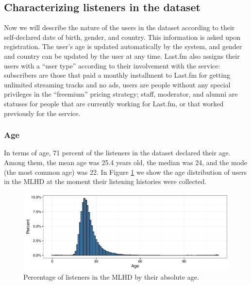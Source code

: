 \subsection{Characterizing listeners in the dataset }\label{subsec:dataset-listeners}
Now we will describe the nature of the users in the dataset according to their self-declared date of birth, gender, and country. This information is asked upon registration. The user's age is updated automatically by the system, and gender and country can be updated by the user at any time. 
Last.fm also assigns their users with a ``user type'' according to their involvement with the service: subscribers are those that paid a monthly installment to Last.fm for getting unlimited streaming tracks and no ads, users are people without any special privileges in the ``freemium'' pricing strategy; staff, moderator, and alumni are statuses for people that are currently working for Last.fm, or that worked previously for the service.

\subsubsection{Age}
In terms of age, 71 percent of the listeners in the dataset declared their age. Among them, the mean age was 25.4 years old, the median was 24, and the mode (the most common age) was 22. In Figure \ref{fig:1_age_frequency} we show the age distribution of users in the MLHD at the moment their listening histories were collected. 


\begin{figure}[hpt]
\vspace{1em}
\centering
\includegraphics[width=1.00\textwidth]{1_age_frequency_2.pdf}				
\caption[Percentage of listeners in the dataset by their absolute age]{Percentage of listeners in the MLHD by their absolute age.}
\label{fig:1_age_frequency}
\end{figure}


